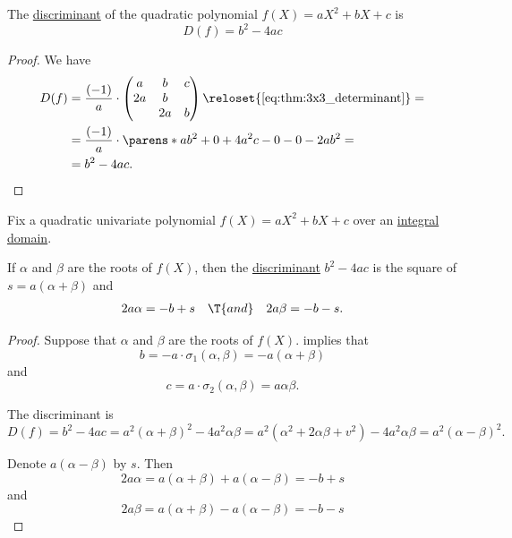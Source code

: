 \begin{lemma}\label{thm:quadratic_polynomial_discriminant}
  The \hyperref[def:discriminant]{discriminant} of the quadratic polynomial \( f(X) = a X^2 + b X + c \) is
  \begin{equation}\label{eq:thm:quadratic_polynomial_discriminant}
    D(f) = b^2 - 4ac
  \end{equation}
\end{lemma}
\begin{proof}
  We have
  \begin{align*}
    D(f)
    &=
    \frac {(-1)} a \cdot \begin{pmatrix}
      a  & b  & c  \\
      2a & b  &    \\
         & 2a & b
    \end{pmatrix}
    \reloset {\eqref{eq:thm:3x3_determinant}} = \\ &=
    \frac {(-1)} a \cdot \parens*{ ab^2 + 0 + 4a^2c - 0 - 0 - 2ab^2 }
    = \\ &=
    b^2 - 4ac.
  \end{align*}
\end{proof}

\begin{proposition}\label{thm:quadratic_polynomial_roots}
  Fix a quadratic univariate polynomial \( f(X) = a X^2 + b X + c \) over an \hyperref[def:integral_domain]{integral domain}.

  If \( \alpha \) and \( \beta \) are the roots of \( f(X) \), then the \hyperref[def:discriminant]{discriminant} \( b^2 - 4ac \) is the square of \( s = a(\alpha + \beta) \) and
  \begin{align*}
    2a\alpha = -b + s
    &&\T{and}&&
    2a\beta = -b - s.
  \end{align*}
\end{proposition}
\begin{proof}
  Suppose that \( \alpha \) and \( \beta \) are the roots of \( f(X) \).  implies that
  \begin{equation*}
    b =  -a \cdot \sigma_1(\alpha, \beta) = -a(\alpha + \beta)
  \end{equation*}
  and
  \begin{equation*}
    c = a \cdot \sigma_2(\alpha, \beta) = a\alpha\beta.
  \end{equation*}

  The discriminant is
  \begin{equation*}
    D(f) = b^2 - 4ac = a^2(\alpha + \beta)^2 - 4a^2 \alpha\beta = a^2 (\alpha^2 + 2\alpha\beta + v^2) - 4a^2 \alpha\beta = a^2 (\alpha - \beta)^2.
  \end{equation*}

  Denote \( a(\alpha - \beta) \) by \( s \). Then
  \begin{equation*}
    2a\alpha = a(\alpha + \beta) + a(\alpha - \beta) = -b + s
  \end{equation*}
  and
  \begin{equation*}
    2a\beta = a(\alpha + \beta) - a(\alpha - \beta) = -b - s
  \end{equation*}
\end{proof}

